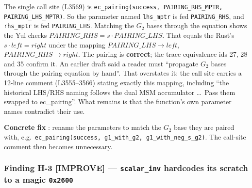 The single call site (L3569) is
\texttt{ec\_\allowbreak{}pairing(success, PAIRING\_\allowbreak{}RHS\_\allowbreak{}MPTR, PAIRING\_\allowbreak{}LHS\_\allowbreak{}MPTR)}.
So the parameter named \texttt{lhs\_mptr} is fed \texttt{PAIRING\_RHS},
and \texttt{rhs\_mptr} is fed \texttt{PAIRING\_LHS}. Matching the
$G_2$ bases through the equation shows the Yul checks
$\mathit{PAIRING\_RHS}=s\cdot\mathit{PAIRING\_LHS}$. That equals the
Rust's $s\cdot\mathit{left}=\mathit{right}$ under the mapping
$\mathit{PAIRING\_LHS}\!\to\!\mathit{left}$,
$\mathit{PAIRING\_RHS}\!\to\!\mathit{right}$. The pairing is
\textbf{correct}; the trace-equivalence ids 27, 28 and 35 confirm it.
 An earlier draft said a reader must
``propagate $G_2$ bases through the pairing equation by hand''.
That overstates it: the call site carries a 12-line comment
(L3555--3566) stating exactly this mapping, including ``the
historical LHS/RHS naming follows the dual MSM accumulator \ldots\
Pass them swapped to ec\_pairing''. What remains is that the
function's own parameter names contradict their use.

\textbf{Concrete fix} : rename the parameters to match
the $G_2$ base they are paired with, e.g.\
\texttt{ec\_\allowbreak{}pairing(success, g1\_\allowbreak{}with\_\allowbreak{}g2, g1\_\allowbreak{}with\_\allowbreak{}neg\_\allowbreak{}s\_\allowbreak{}g2)}.
The call-site comment then becomes unnecessary.

\subsubsection*{Finding H-3 \textcolor{codegenblue}{[IMPROVE]} --- \texttt{scalar\_inv} hardcodes its scratch to a magic \texttt{0x2600}}


